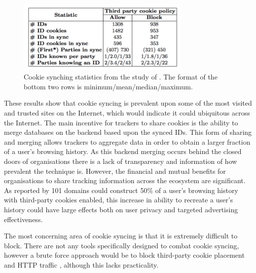 \documentclass{article}
\begin{document}
\begin{figure}[H]
    \centering
    \includegraphics[width=0.75\textwidth]{cookieSynching}
    \caption{Cookie synching statistics from the study of \parencite{webNeverForgets}. The format of the bottom two rows is minimum/mean/median/maximum.}
    \label{fig:cookieSynching}
\end{figure}

These results show that cookie syncing is prevalent upon some of the most visited and trusted sites on the Internet, which would indicate it could ubiquitous across the Internet. The main incentive for trackers to share cookies is the ability to merge databases on the backend based upon the synced IDs. This form of sharing and merging allows trackers to aggregate data in order to obtain a larger fraction of a user's browsing history. As this backend merging occurs behind the closed doors of organisations there is a lack of transparency and information of how prevalent the technique is.  However, the financial and mutual benefits for organisations to share tracking information across the ecosystem are significant. As reported by \parencite{webNeverForgets}  101 domains could construct 50\% of a user's browsing history with third-party cookies enabled, this increase in ability to recreate a user's history could have large effects both on user privacy and targeted advertising effectiveness. \newline

The most concerning area of cookie syncing is that it is extremely difficult to block. There are not any tools specifically designed to combat cookie syncing, however a brute force approach would be to block third-party cookie placement and HTTP traffic \parencite{webNeverForgets}, although this lacks practicality. 

\end{document}
